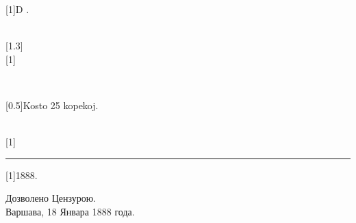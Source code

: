 \documentclass[ngerman,12pt,twoside]{book}
\begin{document}
\sloppy
\begin{titlepage}

\newlength{\tempparskip}
\setlength{\tempparskip}{\parskip}
\setlength{\parskip}{2ex}

\vspace*{\fill}

\begin{center}

\scalebox{0.8}[1]{\latin\huge D .}

\\[3ex]

\scalebox{1.3}[1.3]{\latino{\Huge{%
\scalebox{2}[2]{D}\thinspace{}\scalebox{1.3}[1]{UA}~%
\scalebox{2}[2]{L}\thinspace{}\thinspace{}\scalebox{1.3}[1]{IBRO}}}}\\[4ex]

\scalebox{1.5}[1]{}\\[4ex]


\\[3ex]

\kajerobox


\scalebox{1}[0.5]{\LARGE Kosto 25 kopekoj.}

\\[3ex]

\scalebox{0.7}[1]{\Large {}}

\rule[1ex]{3em}{0.4pt}

\scalebox{1.5}[1]{{\large 1888.}}

\end{center}

\vspace*{\fill}

\setlength{\parskip}{\tempparskip}
\end{titlepage}

%
%
\renewcommand{\footrulewidth}{0.4pt}

\vspace*{12em}

\begin{table}[h]
\begin{center}
{\large Дозволено Цензурою. \\
\vspace{1ex}
Варшава, 18 Январа 1888 года.}
\end{center}

\end{table}
\end{document}
